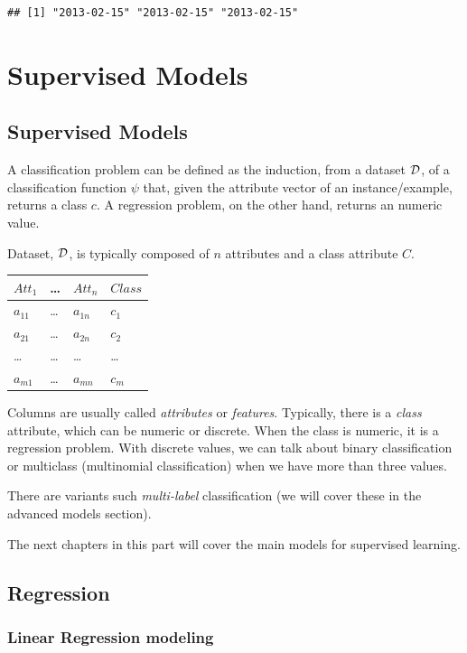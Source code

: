 \documentclass[]{book}
\begin{document}
\begin{verbatim}
## [1] "2013-02-15" "2013-02-15" "2013-02-15"
\end{verbatim}

\part{Supervised Models}\label{part-supervised-models}

\chapter{Supervised Models}\label{supervised-models}

A classification problem can be defined as the induction, from a dataset
\(\cal D\), of a classification function \(\psi\) that, given the
attribute vector of an instance/example, returns a class \({c}\). A
regression problem, on the other hand, returns an numeric value.

Dataset, \(\cal D\), is typically composed of \(n\) attributes and a
class attribute \(C\).

\begin{longtable}[]{@{}llll@{}}
\toprule
\(Att_1\) & \ldots{} & \(Att_n\) & \(Class\)\tabularnewline
\midrule
\endhead
\(a_{11}\) & \ldots{} & \(a_{1n}\) & \(c_1\)\tabularnewline
\(a_{21}\) & \ldots{} & \(a_{2n}\) & \(c_2\)\tabularnewline
\ldots{} & \ldots{} & \ldots{} & \ldots{}\tabularnewline
\(a_{m1}\) & \ldots{} & \(a_{mn}\) & \(c_m\)\tabularnewline
\bottomrule
\end{longtable}

Columns are usually called \emph{attributes} or \emph{features}.
Typically, there is a \emph{class} attribute, which can be numeric or
discrete. When the class is numeric, it is a regression problem. With
discrete values, we can talk about binary classification or multiclass
(multinomial classification) when we have more than three values.

There are variants such \emph{multi-label} classification (we will cover
these in the advanced models section).

The next chapters in this part will cover the main models for supervised
learning.

\chapter{Regression}\label{regression}

\section{Linear Regression modeling}\label{linear-regression-modeling}
\end{document}
